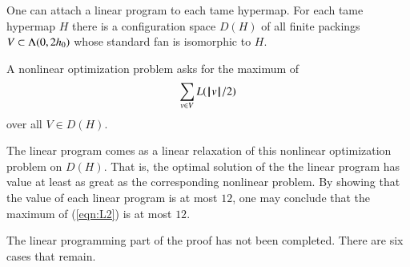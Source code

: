 One can attach a linear program to each tame hypermap.
For each tame hypermap $H$ there is a configuration space $D(H)$ of all
finite packings $V\subset \Lambda(0,2{h_0})$ whose standard fan is
isomorphic to $H$.

A nonlinear optimization problem asks for the maximum of
\begin{equation}\label{eqn:L2}
\sum_{v\in V} L({{\hskip0.1em|\hskip-0.15em|\hskip0.1em}v{\hskip0.1em|\hskip-0.15em|\hskip0.1em}}/2)
\end{equation}
over all $V\in D(H)$.

The linear program comes as a linear relaxation of this nonlinear
optimization problem on $D(H)$. That is, the optimal solution of the
the linear program has value at least as great as the corresponding
nonlinear problem.  By showing that the value of each linear program
is at most $12$, one may conclude that the maximum of (\ref{eqn:L2})
is at most $12$.


\begin{note}%
The linear programming part of the proof has not been completed. There are six cases that remain.
\end{note}

